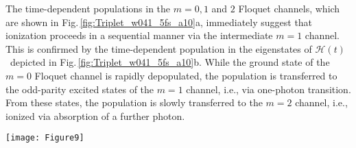 \documentclass[
pra%
,preprint%
,amssymb, nobibnotes, aps, superscriptaddress, floatfix]{revtex4}
\newcommand{\fig}{Fig.\,}
\newcommand{\CAHt}{$\mathcal{H}(t)$}
\begin{document}
The time-dependent populations in the $m=0, 1$ and $2$ Floquet channels, which are shown  in \fig \ref{fig:Triplet_w041_5fs_a10}a, immediately suggest that ionization proceeds in a sequential manner via the intermediate $m=1$ channel.
This is confirmed by the time-dependent population in the eigenstates of \CAHt\ depicted in \fig \ref{fig:Triplet_w041_5fs_a10}b. While the ground state of the $m=0$ Floquet channel is rapidly depopulated, the population is transferred to the odd-parity excited states of the $m=1$ channel, i.e., via one-photon transition. From these states, the population is slowly transferred to the $m=2$ channel, i.e., ionized via absorption of a further photon. 


\begin{figure*}
	\centering
	\texttt{[image: Figure9]}
	\caption{(a) Final population in the  ground state and $n=3, 5, 7$ excited states of \CAHt\ as a function of pulse duration for $\omega=0.4$ a.u. frequency and $I=9 \times 10^{16} \, \text{W/cm}^2$ maximum intensity laser pulse; the vertical dashed line indicates the pulse duration used in \fig \ref{fig:Triplet_w041_5fs_a10} and pulse durations when $n=0$ and $n=3$ state dominate; (b) frequency of population oscillations for each excited state;  (c) and (d) shows time-dependent population in the excited states for pulse durations when $n=0$ and $n=3$ state are dominantly populated after the pulse (indicated by vertical dashed lines in (a)).}
	\label{fig:KH_w041_scan_fwhm_a10}
\end{figure*}
\end{document}
